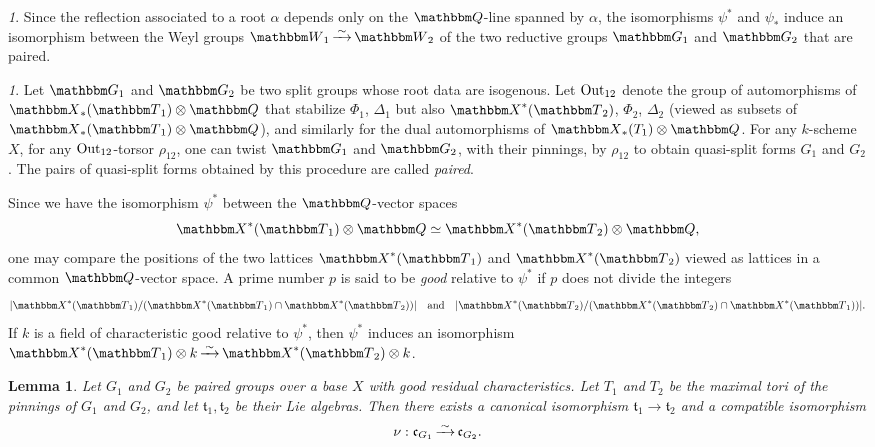 \documentclass[12pt,english]{smfart}
\numberwithin{equation}{subsection}
\newtheorem{lemma}[equation]{Lemma}
\theoremstyle{remark}
\newtheorem{numero}[equation]{}
\newcommand\frakt{{\mathfrak t}}
\newcommand\frakc{{\mathfrak c}}
\newcommand\QQ{{\mathbbm Q}}
\newcommand\bbW{{\mathbbm W}}
\newcommand\bbT{{\mathbbm T}}
\newcommand\bbG{{\mathbbm G}}
\newcommand\bbX{{\mathbbm X}}
\newcommand\Out{{\rm Out}}
\newcommand\isom{\,\smash{\mathop{\hbox to 5mm{\rightarrowfill}}
    \limits^\sim}\,}
\begin{document}
\begin{numero}\label{apparies}
Since the reflection associated to a root $\alpha$ depends only on the $\QQ$-line spanned by $\alpha$, the isomorphisms $\psi^*$ and $\psi_*$ induce an isomorphism between the Weyl groups $\bbW_1 \isom \bbW_2$ of the two reductive groups $\bbG_1$ and $\bbG_2$ that are paired.
\end{numero}

\begin{numero}
Let $\bbG_1$ and $\bbG_2$ be two split groups whose root data are isogenous. Let $\Out_{12}$ denote the group of automorphisms of $\bbX_*(\bbT_1)\otimes\QQ$ that stabilize $\Phi_1$, $\Delta_1$ but also $\bbX^*(\bbT_2)$, $\Phi_2$, $\Delta_2$ (viewed as subsets of $\bbX_*(\bbT_1)\otimes\QQ$), and similarly for the dual automorphisms of $\bbX_*(T_1)\otimes\QQ$. For any $k$-scheme $X$, for any $\Out_{12}$-torsor $\rho_{12}$, one can twist $\bbG_1$ and $\bbG_2$, with their pinnings, by $\rho_{12}$ to obtain quasi-split forms $G_1$ and $G_2$. The pairs of quasi-split forms obtained by this procedure are called {\em paired}.
\end{numero}

Since we have the isomorphism $\psi^*$ between the $\QQ$-vector spaces
$$\bbX^*(\bbT_1)\otimes\QQ\simeq\bbX^*(\bbT_2)\otimes\QQ,$$
one may compare the positions of the two lattices $\bbX^*(\bbT_1)$ and
$\bbX^*(\bbT_2)$ viewed as lattices in a common $\QQ$-vector space. A prime number $p$ is said to be {\em good} relative to $\psi^*$ if $p$ does not divide the integers
$$|\bbX^*(\bbT_1)/(\bbX^*(\bbT_1) \cap \bbX^*(\bbT_2))|
\quad \text{and} \quad |\bbX^*(\bbT_2)/(\bbX^*(\bbT_2) \cap \bbX^*(\bbT_1))|.
$$
If $k$ is a field of characteristic good relative to $\psi^*$, then $\psi^*$ induces an isomorphism $\bbX^*(\bbT_1)\otimes k \isom \bbX^*(\bbT_2)\otimes k$.

\begin{lemma}\label{c_G_1=c_G_2}
Let $G_1$ and $G_2$ be paired groups over a base $X$ with good residual characteristics. Let $T_1$ and $T_2$ be the maximal tori of the pinnings of $G_1$ and $G_2$, and let $\frakt_1, \frakt_2$ be their Lie algebras. Then there exists a canonical isomorphism $\frakt_1\rightarrow \frakt_2$ and a compatible isomorphism
$$\nu:\frakc_{G_1}\isom \frakc_{G_2}.$$
\end{lemma}
\end{document}
